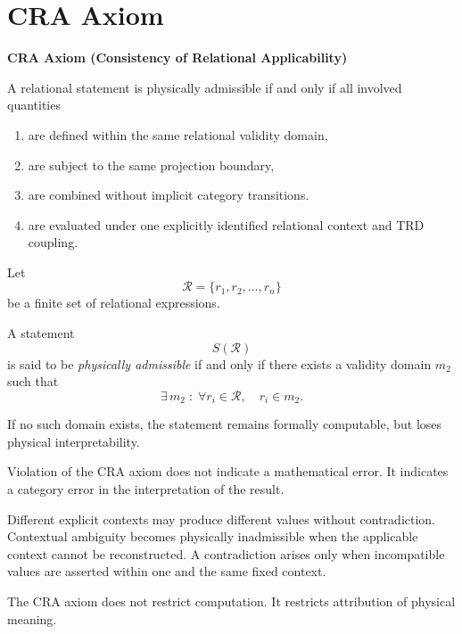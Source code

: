 \section{CRA Axiom}

\textbf{CRA Axiom (Consistency of Relational Applicability)}

A relational statement is physically admissible if and only if
all involved quantities

\begin{enumerate}
    \item are defined within the same relational validity domain,
    \item are subject to the same projection boundary,
    \item are combined without implicit category transitions.
    \item are evaluated under one explicitly identified relational context
    and TRD coupling.
\end{enumerate}

Let
\[
\mathcal{R} = \{ r_1, r_2, \dots, r_n \}
\]
be a finite set of relational expressions.

A statement
\[
S(\mathcal{R})
\]
is said to be \emph{physically admissible} if and only if there exists
a validity domain $m_2$ such that
\[
\exists\, m_2 \;:\;
\forall r_i \in \mathcal{R}, \quad r_i \in m_2.
\]

If no such domain exists, the statement remains formally computable,
but loses physical interpretability.

Violation of the CRA axiom does not indicate a mathematical error.
It indicates a category error in the interpretation of the result.

Different explicit contexts may produce different values without contradiction.
Contextual ambiguity becomes physically inadmissible when the applicable context
cannot be reconstructed. A contradiction arises only when incompatible values
are asserted within one and the same fixed context.

The CRA axiom does not restrict computation.
It restricts attribution of physical meaning.
